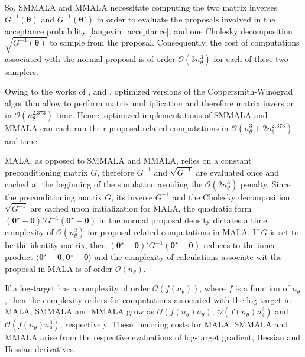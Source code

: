 \documentclass[twoside,11pt]{article}
\begin{document}
So, SMMALA and MMALA necessitate computing the two matrix inverses $G^{-1}(\boldsymbol{\theta})$ and 
$G^{-1}(\boldsymbol{\theta}^{\star})$ in order to evaluate the proposals involved in the acceptance probability 
\eqref{langevin_acceptance}, and one Cholesky decomposition $\sqrt{G^{-1}(\boldsymbol{\theta})}$ to sample from the 
proposal. Consequently, the cost of computations associated with the normal proposal is of order $\mathcal{O}(3n_\theta^3)$ 
for each of these two samplers.

Owing to the works of \cite{dav_sto__imp}, \cite{wil__brea} and \cite{leg__pow},
optimized versions of the Coppersmith-Winograd algorithm allow to perform matrix multiplication and therefore matrix 
inversion in $\mathcal{O}(n_\theta^{2.373})$ time. Hence, optimized implementations of SMMALA and MMALA can each run their
proposal-related computations in $\mathcal{O}(n_\theta^3+2n_\theta^{2.373})$ and time.

MALA, as opposed to SMMALA and MMALA, relies on a constant preconditioning matrix $G$, therefore $G^{-1}$ and 
$\sqrt{G^{-1}}$ are evaluated once and cached at the beginning of the simulation avoiding the $\mathcal{O}(2n_\theta^3)$ 
penalty. Since the preconditioning matrix $G$, its inverse $G^{-1}$ and the Cholesky decomposition $\sqrt{G^{-1}}$ are 
cached upon initialization for MALA, the quadratic form
$
(\boldsymbol{\theta}^{\star}-\boldsymbol{\theta})'
G^{-1}
(\boldsymbol{\theta}^{\star}-\boldsymbol{\theta})
$
in the normal proposal density dictates a time complexity of $\mathcal{O}(n_{\theta}^2)$ for proposal-related computations
in MALA. If $G$ is set to be the identity matrix, then
$
(\boldsymbol{\theta}^{\star}-\boldsymbol{\theta})'
G^{-1}
(\boldsymbol{\theta}^{\star}-\boldsymbol{\theta})
$
reduces to the inner product
$
\langle\boldsymbol{\theta}^{\star}-\boldsymbol{\theta},
\boldsymbol{\theta}^{\star}-\boldsymbol{\theta}\rangle
$ and the complexity of calculations associate wit the proposal in MALA is of order $\mathcal{O}(n_{\theta})$.

If a log-target has a complexity of order $\mathcal{O}(f(n_{\theta}))$, where $f$ is a function of $n_{\theta}$, then the 
complexity orders for computations associated with the log-target in MALA, SMMALA and MMALA grow as 
$\mathcal{O}(f(n_{\theta})n_{\theta})$, $\mathcal{O}(f(n_{\theta})n_\theta^2)$ and $\mathcal{O}(f(n_{\theta})n_{\theta}^3)$, 
respectively. These incurring costs for MALA, SMMALA and MMALA arise from the respective evaluations of log-target gradient, 
Hessian and Hessian derivatives.
\end{document}

